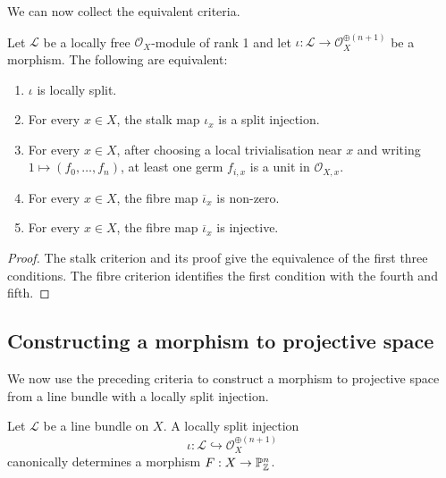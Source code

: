 We can now collect the equivalent criteria.

\begin{proposition}\label{prop:lsi-equivalent-conditions}
    Let \(\mathcal{L}\) be a locally free \(\mathcal{O}_X\)-module of rank 1
    and let \(\iota:\mathcal{L}\to\mathcal{O}_X^{\oplus(n+1)}\) be a
    morphism. The following are equivalent:
    \begin{enumerate}
        \item \(\iota\) is locally split.
        \item For every \(x\in X\), the stalk map \(\iota_x\) is a split
            injection.
        \item For every \(x\in X\), after choosing a local trivialisation
            near \(x\) and writing \(1\mapsto(f_0,\dots,f_n)\), at least one
            germ \(f_{i,x}\) is a unit in \(\mathcal{O}_{X,x}\).
        \item For every \(x\in X\), the fibre map
            \(\overline{\iota}_x\) is non-zero.
        \item For every \(x\in X\), the fibre map
            \(\overline{\iota}_x\) is injective.
    \end{enumerate}
\end{proposition}

\begin{proof}
    The stalk criterion and its proof give the equivalence of the first
    three conditions. The fibre criterion identifies the first condition
    with the fourth and fifth.
\end{proof}

\subsection*{Constructing a morphism to projective space}

We now use the preceding criteria to construct a morphism to projective
space from a line bundle with a locally split injection.

\begin{proposition}\label{prop:lsi-map-to-projective-space}
    Let \(\mathcal{L}\) be a line bundle on \(X\). A locally split injection
    \[
        \iota:\mathcal{L}\hookrightarrow
        \mathcal{O}_X^{\oplus(n+1)}
    \]
    canonically determines a morphism
    \(F:X\to\mathbb{P}^n_{\mathbb{Z}}\).
\end{proposition}

